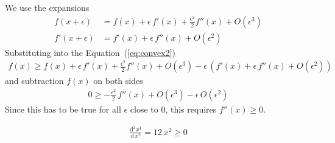 \documentclass{sotonExamBoxes}    %
\newcommand{\bra}[1]{\left(#1\right)}
\newcommand{\dd}{\mathrm{d}}
\begin{document}
\begin{question}{10}
\begin{qparts}
      \begin{answer}
        We use the expansions
        \begin{align*}
          f(x+\epsilon) &= f(x) + \epsilon\,f'(x) +
                          \frac{\epsilon^2}{2} f''(x) + O(\epsilon^3) \\
          f'(x+\epsilon) &= f'(x) + \epsilon\,f''(x) +
                           O(\epsilon^2) 
        \end{align*}
        Substituting into the Equation~(\ref{eq:convex2})
        \begin{align*}
          f(x) \geq f(x) + \epsilon\,f'(x) +
          \frac{\epsilon^2}{2} f''(x) + O(\epsilon^3)
          - \epsilon\,\bra{f'(x) + \epsilon\,f''(x) +
                           O(\epsilon^2) }
        \end{align*}
        and subtraction $f(x)$ on both sides
        \begin{align*}
          0 \geq - \frac{\epsilon^2}{2} \, f''(x) + O(\epsilon^3) - \epsilon\,O(\epsilon^2) 
        \end{align*}
        Since this has to be true for all $\epsilon$ close to $0$, this requires $f''(x)\geq0$.
      \end{answer}
      \begin{answer}
        \begin{align*}
          \frac{\dd^2 x^4}{\dd \, x^2} = 12\,x^2 \geq 0
        \end{align*}
      \end{answer}
  \end{qparts}
\end{question}
\freshpage

\end{document}
